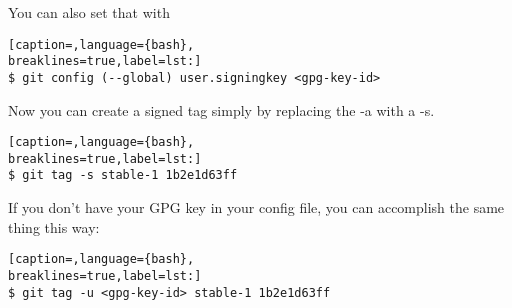 You can also set that with
\lstset{basicstyle=\scriptsize, numbers=none, captionpos=b, tabsize=4}
\begin{lstlisting}[caption=,language={bash},
breaklines=true,label=lst:]
$ git config (--global) user.signingkey <gpg-key-id>
\end{lstlisting}

Now you can create a signed tag simply by replacing the -a with a -s.
\lstset{basicstyle=\scriptsize, numbers=none, captionpos=b, tabsize=4}
\begin{lstlisting}[caption=,language={bash},
breaklines=true,label=lst:]
$ git tag -s stable-1 1b2e1d63ff
\end{lstlisting}

If you don't have your GPG key in your config file, you can accomplish the same
thing this way:
\lstset{basicstyle=\scriptsize, numbers=none, captionpos=b, tabsize=4}
\begin{lstlisting}[caption=,language={bash},
breaklines=true,label=lst:]
$ git tag -u <gpg-key-id> stable-1 1b2e1d63ff
\end{lstlisting}
